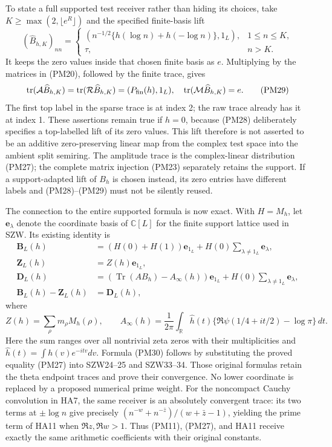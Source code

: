 \documentclass[
  10pt,
  a4paper,
]{article}
\begin{document}
To state a full supported test receiver rather than hiding its choices,
take \(K\ge\max(2,\lfloor e^R\rfloor)\) and the specified finite-basis
lift \[
(\widehat B_{h,K})_{nn}=
\begin{cases}(n^{-1/2}\{h(\log n)+h(-\log n)\},1_L),&1\le n\le K,\\
\tau,&n>K.
\end{cases}
\tag{PM28}
\] It keeps the zero values inside that chosen finite basis as \(e\).
Multiplying by the matrices in (PM20), followed by the finite trace,
gives \[
\operatorname{tr}(\mathcal A\widehat B_{h,K})
=\operatorname{tr}(\mathcal R\widehat B_{h,K})
=(P_{\rm fin}(h),1_L),
\quad
\operatorname{tr}(\mathcal M\widehat B_{h,K})=e.
\tag{PM29}
\] The first top label in the sparse trace is at index 2; the raw trace
already has it at index 1. These assertions remain true if \(h=0\),
because (PM28) deliberately specifies a top-labelled lift of its zero
values. This lift therefore is not asserted to be an additive
zero-preserving linear map from the complex test space into the ambient
split semiring. The amplitude trace is the complex-linear distribution
(PM27); the complete matrix injection (PM23) separately retains the
support. If a support-adapted lift of \(B_h\) is chosen instead, its
zero entries have different labels and (PM28)--(PM29) must not be
silently reused.

The connection to the entire supported formula is now exact. With
\(H=M_h\), let \(\mathbf e_\lambda\) denote the coordinate basis of
\(\mathbb C[L]\) for the finite support lattice used in SZW. Its
existing identity is \[
\begin{split}
\boldsymbol B_L(h)&=(H(0)+H(1))\mathbf e_{1_L}
 +H(0)\sum_{\lambda\ne1_L}\mathbf e_\lambda,\\
\boldsymbol Z_L(h)&=Z(h)\mathbf e_{1_L},\\
\boldsymbol D_L(h)&=(\operatorname{Tr}(AB_h)-A_\infty(h))\mathbf e_{1_L}
 +H(0)\sum_{\lambda\ne1_L}\mathbf e_\lambda,\\
\boldsymbol B_L(h)-\boldsymbol Z_L(h)&=\boldsymbol D_L(h),
\end{split}
\tag{PM30}
\] where \[
Z(h)=\sum_\rho m_\rho M_h(\rho),\qquad
A_\infty(h)=\frac1{2\pi}\int_{\mathbb R}\widehat h(t)
\{\Re\psi(1/4+it/2)-\log\pi\}\,dt.
\tag{PM31}
\] Here the sum ranges over all nontrivial zeta zeros with their
multiplicities and \(\widehat h(t)=\int h(v)e^{-itv}dv\). Formula (PM30)
follows by substituting the proved equality (PM27) into SZW24--25 and
SZW33--34. Those original formulas retain the theta endpoint traces and
prove their convergence. No lower coordinate is replaced by a proposed
numerical prime weight. For the noncompact Cauchy convolution in HA7,
the same receiver is an absolutely convergent trace: its two terms at
\(\pm\log n\) give precisely \((n^{-w}+n^{-\bar z})/(w+\bar z-1)\),
yielding the prime term of HA11 when \(\Re z,\Re w>1\). Thus (PM11),
(PM27), and HA11 receive exactly the same arithmetic coefficients with
their original constants.
\end{document}
